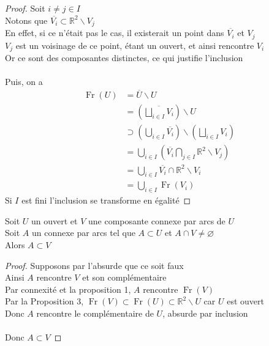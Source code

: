 \documentclass{article}
\begin{document}
\begin{flushleft}
\begin{proof}
    Soit $i \neq j \in I$\\
    Notons que $\overline{V_i} \subset \mathbb{R}^2 \backslash V_j$\\
    En effet, si ce n'était pas le cas, il existerait un point dans $\overline{V_i}$ et $V_j$\\
    $V_j$ est un voisinage de ce point, étant un ouvert, et ainsi rencontre $V_i$\\
    Or ce sont des composantes distinctes, ce qui justifie l'inclusion
    \\~\\
    Puis, on a
    \begin{align*}
        \operatorname{Fr}(U) &= \overline{U} \backslash U\\
        &= \left( \overline{\bigsqcup_{i \in I} V_i} \right) \backslash U\\
        &\supset \left( \bigcup_{i \in I} \overline{V_i} \right) \backslash \left( \bigsqcup_{i \in I} V_i \right)\\
        &= \bigcup_{i \in I} \left( \overline{V_i} \bigcap_{j \in I} \mathbb{R}^2 \backslash V_j \right)\\
        &= \bigcup_{i \in I} \overline{V_i} \cap \mathbb{R}^2 \backslash V_i\\
        &= \bigcup_{i \in I} \operatorname{Fr}(V_i)
    \end{align*}
    Si $I$ est fini l'inclusion se transforme en égalité
\end{proof}

\begin{tcolorbox}[colback = purple!20!white, colframe = purple!60!white, title = Proposition 4]
    Soit $U$ un ouvert et $V$ une composante connexe par arcs de $U$\\
    Soit $A$ un connexe par arcs tel que $A \subset U$ et $A \cap V \neq \varnothing$\\
    Alors $A \subset V$
\end{tcolorbox}

\begin{proof}
    Supposons par l'absurde que ce soit faux\\
    Ainsi $A$ rencontre $V$ et son complémentaire\\
    Par connexité et la proposition 1, $A$ rencontre $\operatorname{Fr}(V)$\\
    Par la Proposition 3, $\operatorname{Fr}(V) \subset \operatorname{Fr}(U) \subset \mathbb{R}^2 \backslash U$ car $U$ est ouvert\\
    Donc $A$ rencontre le complémentaire de $U$, absurde par inclusion
    \\~\\
    Donc $A \subset V$
\end{proof}


\end{flushleft}
\end{document}
